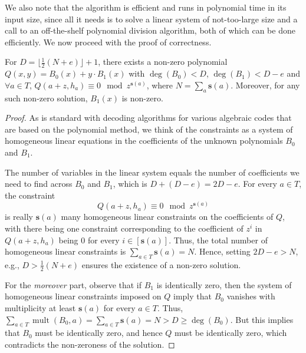\documentclass{article}
\newcommand{\hpartial}{{\bar{\partial}}}
\newcommand{\mult}{\operatorname{mult}}
\newcommand{\sbar}{\mathbf{s}}
\begin{document}
	We also note that the algorithm is efficient and runs in polynomial time in its input size, since all it needs is to solve a linear system of not-too-large size and a call to an off-the-shelf polynomial division algorithm, both of which can be done efficiently. We now proceed with the proof of correctness. 
	
	
	\begin{claim}\label{clm: interpolation}
		For $D = \lfloor \frac{1}{2}(N+e) \rfloor + 1$, there exists a non-zero polynomial $Q(x,y) = B_0(x)+y\cdot B_1(x)$ with $\deg(B_0) < D$, $\deg(B_1) < D-e$ and $\forall a \in T$, $Q(a+z, h_a) \equiv 0 \mod z^{\sbar(a)}$, where $N = \sum_a \sbar(a)$. 
		Moreover, for any such non-zero solution, $B_1(x)$ is non-zero.
	\end{claim}
	
	\begin{proof}
		As is standard with decoding algorithms for various algebraic codes that are based on the polynomial method, we think of the constraints as a system of homogeneous linear equations in the coefficients of the unknown polynomials $B_0$ and $B_1$. 
		
		The number of variables in the linear system equals the number of
		coefficients we need to find across $B_0$ and $B_1$, which is
		$D+(D-e) = 2D-e$. For every $a \in T$, the constraint
		\[ Q(a+z, h_a) \equiv 0 \mod z^{\sbar(a)} \] is really $\sbar(a)$ many
		homogeneous linear constraints on the coefficients of $Q$, with there
		being one constraint corresponding to the coefficient of $z^i$ in
		$Q(a+z, h_a)$ being $0$ for every $i \in [\sbar(a)]$. Thus, the total
		number of homogeneous linear constraints is
		$\sum_{a\in T} \sbar(a) = N$. Hence, setting $2D-e >N$, e.g.,
		$D > \frac{1}{2}(N+e)$ ensures the existence of a non-zero solution.
		
		For the \emph{moreover} part, observe that if $B_1$ is identically
		zero, then the system of homogeneous linear constraints imposed on $Q$
		imply that $B_0$ vanishes with multiplicity at least $\sbar(a)$ for
		every $a \in T$. Thus,
		$\sum_{a \in T} \mult(B_0, a) = \sum_{a \in T} \sbar(a) = N > D \geq
		\deg(B_0)$. But this implies that $B_0$ must be identically zero, and
		hence $Q$ must be identically zero, which contradicts the non-zeroness
		of the solution.
	\end{proof}
	
\end{document}
